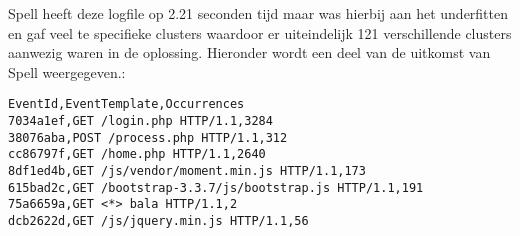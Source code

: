 Spell heeft deze logfile op 2.21 seconden tijd maar was hierbij aan het underfitten en gaf veel te specifieke clusters waardoor er uiteindelijk 121 verschillende clusters aanwezig waren in de oplossing. Hieronder wordt een deel van de uitkomst van Spell weergegeven.:
\begin{verbatim}
EventId,EventTemplate,Occurrences
7034a1ef,GET /login.php HTTP/1.1,3284
38076aba,POST /process.php HTTP/1.1,312
cc86797f,GET /home.php HTTP/1.1,2640
8df1ed4b,GET /js/vendor/moment.min.js HTTP/1.1,173
615bad2c,GET /bootstrap-3.3.7/js/bootstrap.js HTTP/1.1,191
75a6659a,GET <*> bala HTTP/1.1,2
dcb2622d,GET /js/jquery.min.js HTTP/1.1,56
\end{verbatim}